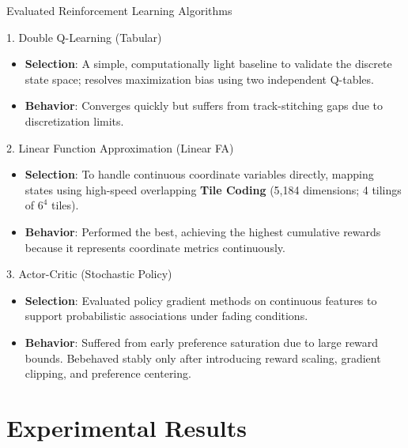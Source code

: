 \documentclass[10pt]{beamer}
\begin{document}
\begin{frame}{Evaluated Reinforcement Learning Algorithms}
    \begin{block}{1. Double Q-Learning (Tabular)}
        \begin{itemize}
            \item \textbf{Selection}: A simple, computationally light baseline to validate the discrete state space; resolves maximization bias using two independent Q-tables.
            \item \textbf{Behavior}: Converges quickly but suffers from track-stitching gaps due to discretization limits.
        \end{itemize}
    \end{block}
    \begin{block}{2. Linear Function Approximation (Linear FA)}
        \begin{itemize}
            \item \textbf{Selection}: To handle continuous coordinate variables directly, mapping states using high-speed overlapping \textbf{Tile Coding} (5,184 dimensions; 4 tilings of $6^4$ tiles).
            \item \textbf{Behavior}: Performed the best, achieving the highest cumulative rewards because it represents coordinate metrics continuously.
        \end{itemize}
    \end{block}
    \begin{block}{3. Actor-Critic (Stochastic Policy)}
        \begin{itemize}
            \item \textbf{Selection}: Evaluated policy gradient methods on continuous features to support probabilistic associations under fading conditions.
            \item \textbf{Behavior}: Suffered from early preference saturation due to large reward bounds. Bebehaved stably only after introducing reward scaling, gradient clipping, and preference centering.
        \end{itemize}
    \end{block}
\end{frame}

\section{Experimental Results}
\end{document}
